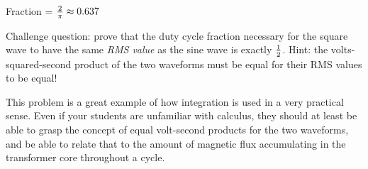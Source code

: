 





Fraction = ${2 \over \pi} \approx 0.637$

\vskip 10pt

Challenge question: prove that the duty cycle fraction necessary for the square wave to have the same {\it RMS value} as the sine wave is exactly ${1 \over 2}$.  Hint: the volts-squared-second product of the two waveforms must be equal for their RMS values to be equal!







This problem is a great example of how integration is used in a very practical sense.  Even if your students are unfamiliar with calculus, they should at least be able to grasp the concept of equal volt-second products for the two waveforms, and be able to relate that to the amount of magnetic flux accumulating in the transformer core throughout a cycle.




